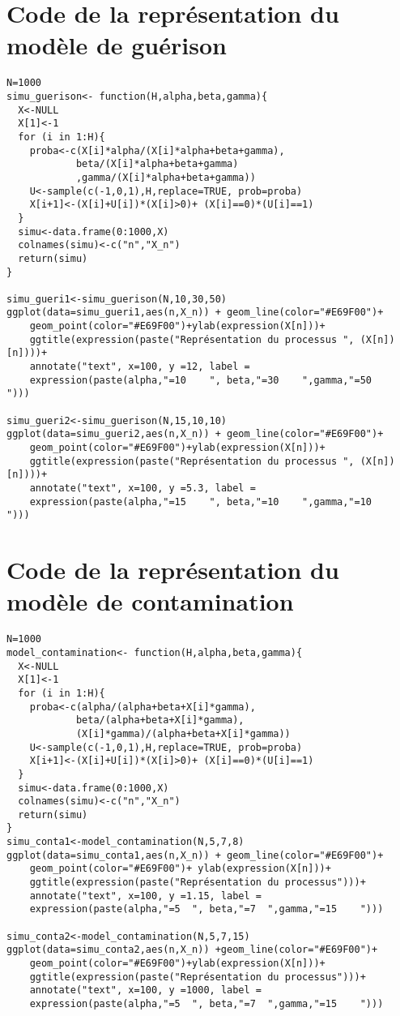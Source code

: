 \documentclass[12pt,a4paper]{report}
\theoremstyle{remark}
\begin{document}
\section*{Code de la représentation du modèle de guérison}
\begin{lstlisting}
N=1000
simu_guerison<- function(H,alpha,beta,gamma){
  X<-NULL
  X[1]<-1
  for (i in 1:H){
    proba<-c(X[i]*alpha/(X[i]*alpha+beta+gamma),
            beta/(X[i]*alpha+beta+gamma)
            ,gamma/(X[i]*alpha+beta+gamma))
    U<-sample(c(-1,0,1),H,replace=TRUE, prob=proba)
    X[i+1]<-(X[i]+U[i])*(X[i]>0)+ (X[i]==0)*(U[i]==1)
  }
  simu<-data.frame(0:1000,X)
  colnames(simu)<-c("n","X_n")
  return(simu)
}

simu_gueri1<-simu_guerison(N,10,30,50)
ggplot(data=simu_gueri1,aes(n,X_n)) + geom_line(color="#E69F00")+
    geom_point(color="#E69F00")+ylab(expression(X[n]))+
    ggtitle(expression(paste("Représentation du processus ", (X[n])[n])))+
    annotate("text", x=100, y =12, label =
    expression(paste(alpha,"=10    ", beta,"=30    ",gamma,"=50    ")))

simu_gueri2<-simu_guerison(N,15,10,10)
ggplot(data=simu_gueri2,aes(n,X_n)) + geom_line(color="#E69F00")+
    geom_point(color="#E69F00")+ylab(expression(X[n]))+
    ggtitle(expression(paste("Représentation du processus ", (X[n])[n])))+
    annotate("text", x=100, y =5.3, label =
    expression(paste(alpha,"=15    ", beta,"=10    ",gamma,"=10    ")))
\end{lstlisting}

\section*{Code de la représentation du modèle de contamination}

\begin{lstlisting}
N=1000
model_contamination<- function(H,alpha,beta,gamma){
  X<-NULL
  X[1]<-1
  for (i in 1:H){
    proba<-c(alpha/(alpha+beta+X[i]*gamma),
            beta/(alpha+beta+X[i]*gamma),
            (X[i]*gamma)/(alpha+beta+X[i]*gamma))
    U<-sample(c(-1,0,1),H,replace=TRUE, prob=proba)
    X[i+1]<-(X[i]+U[i])*(X[i]>0)+ (X[i]==0)*(U[i]==1)
  }
  simu<-data.frame(0:1000,X)
  colnames(simu)<-c("n","X_n")
  return(simu)
}
simu_conta1<-model_contamination(N,5,7,8)
ggplot(data=simu_conta1,aes(n,X_n)) + geom_line(color="#E69F00")+
    geom_point(color="#E69F00")+ ylab(expression(X[n]))+
    ggtitle(expression(paste("Représentation du processus")))+
    annotate("text", x=100, y =1.15, label =
    expression(paste(alpha,"=5  ", beta,"=7  ",gamma,"=15    ")))

simu_conta2<-model_contamination(N,5,7,15)
ggplot(data=simu_conta2,aes(n,X_n)) +geom_line(color="#E69F00")+
    geom_point(color="#E69F00")+ylab(expression(X[n]))+
    ggtitle(expression(paste("Représentation du processus")))+
    annotate("text", x=100, y =1000, label =
    expression(paste(alpha,"=5  ", beta,"=7  ",gamma,"=15    ")))
\end{lstlisting}
\end{document}
